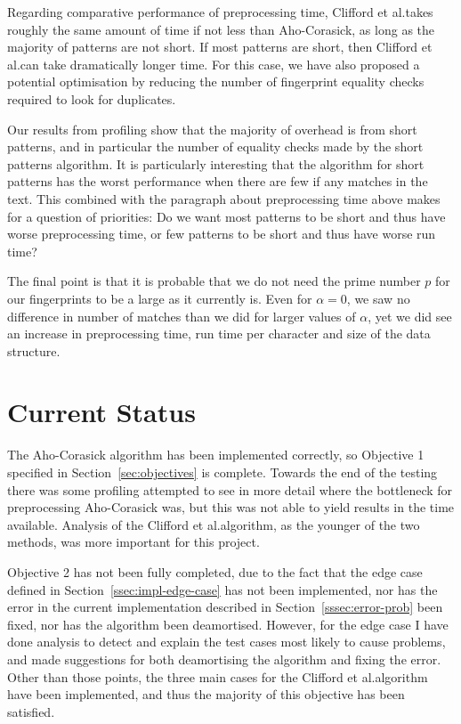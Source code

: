 \documentclass[ %
                    author={Dominic Joseph Moylett},
                    degree={MEng},
                     title={Dictionary Matching with Fingerprints},
                  subtitle={An Empirical Analysis},
                      type={research},
                      year={2015} ]{dissertation}
\begin{document}
Regarding comparative performance of preprocessing time, Clifford et al.\@ takes roughly the same amount of time if not less than Aho-Corasick, as long as the majority of patterns are not short. If most patterns are short, then Clifford et al.\@ can take dramatically longer time. For this case, we have also proposed a potential optimisation by reducing the number of fingerprint equality checks required to look for duplicates.

Our results from profiling show that the majority of overhead is from short patterns, and in particular the number of equality checks made by the short patterns algorithm. It is particularly interesting that the algorithm for short patterns has the worst performance when there are few if any matches in the text. This combined with the paragraph about preprocessing time above makes for a question of priorities: Do we want most patterns to be short and thus have worse preprocessing time, or few patterns to be short and thus have worse run time?

The final point is that it is probable that we do not need the prime number $p$ for our fingerprints to be a large as it currently is. Even for $\alpha = 0$, we saw no difference in number of matches than we did for larger values of $\alpha$, yet we did see an increase in preprocessing time, run time per character and size of the data structure.

\section{Current Status}

The Aho-Corasick algorithm has been implemented correctly, so Objective 1 specified in Section~\ref{sec:objectives} is complete. Towards the end of the testing there was some profiling attempted to see in more detail where the bottleneck for preprocessing Aho-Corasick was, but this was not able to yield results in the time available. Analysis of the Clifford et al.\@ algorithm, as the younger of the two methods, was more important for this project.

Objective 2 has not been fully completed, due to the fact that the edge case defined in Section~\ref{ssec:impl-edge-case} has not been implemented, nor has the error in the current implementation described in Section~\ref{sssec:error-prob} been fixed, nor has the algorithm been deamortised. However, for the edge case I have done analysis to detect and explain the test cases most likely to cause problems, and made suggestions for both deamortising the algorithm and fixing the error. Other than those points, the three main cases for the Clifford et al.\@ algorithm have been implemented, and thus the majority of this objective has been satisfied.
\end{document}

